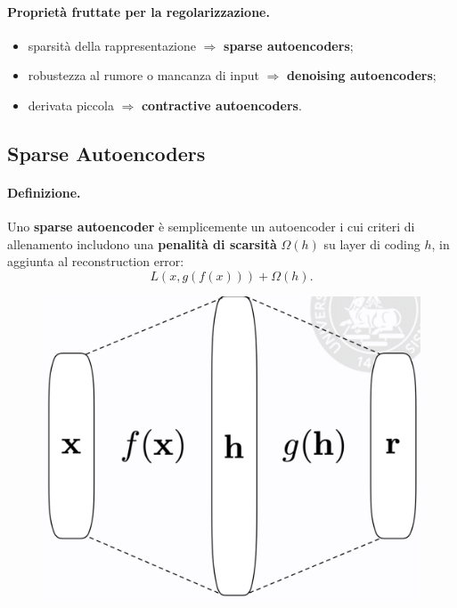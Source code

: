 \paragraph{Proprietà fruttate per la regolarizzazione.}
\begin{itemize}
  \item sparsità della rappresentazione $\Rightarrow$ \textbf{sparse autoencoders};
  \item robustezza al rumore o mancanza di input $\Rightarrow$ \textbf{denoising autoencoders};
  \item derivata piccola $\Rightarrow$ \textbf{contractive autoencoders}.
\end{itemize}

\subsection{Sparse Autoencoders}
\paragraph{Definizione.} Uno \textbf{sparse autoencoder} è semplicemente un autoencoder i cui criteri di 
allenamento includono una \textbf{penalità di scarsità} $\Omega(h)$ su layer di coding $h$, in aggiunta al
reconstruction error:
\begin{equation}
  L(x,g(f(x)))+\Omega(h).
\end{equation}
\begin{figure}[!h]
  \centering
  \includegraphics[scale=.4]{images/autoencoders/sparse_auto.png}
\end{figure}
\newpage

